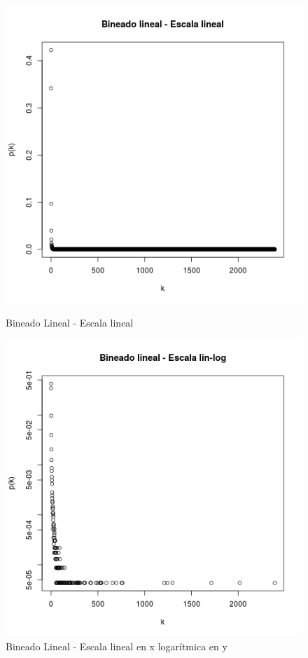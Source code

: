 \documentclass{article}
\begin{document}
\begin{figure}[!htb]
   \begin{minipage}{0.3\textwidth}
	\centering
	\includegraphics[width=.7\linewidth]{Imagenes_P3/P3_binlin_lin.png}
	\caption{Bineado Lineal - Escala lineal}
	\label{pt3linlinlin}
   \end{minipage}\hfill
   \begin{minipage}{0.3\textwidth}
	\centering
	\includegraphics[width=.7\linewidth]{Imagenes_P3/P3_binlin_linlog.png}
	\caption{Bineado Lineal - Escala lineal en x logarítmica en y}
	\label{pt3linlinlog}
   \end{minipage}\hfill
   \begin{minipage}{0.3\textwidth}
	\centering

\end{minipage}
\end{figure}
\end{document}
